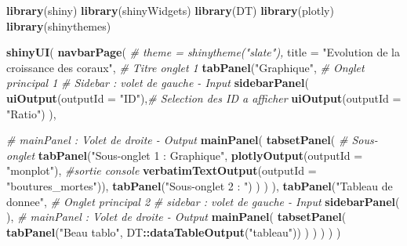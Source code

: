 \documentclass[]{report}
\newenvironment{Shaded}{\begin{snugshade}}{\end{snugshade}}
\newcommand{\KeywordTok}[1]{\textcolor[rgb]{0.13,0.29,0.53}{\textbf{#1}}}
\newcommand{\DataTypeTok}[1]{\textcolor[rgb]{0.13,0.29,0.53}{#1}}
\newcommand{\StringTok}[1]{\textcolor[rgb]{0.31,0.60,0.02}{#1}}
\newcommand{\CommentTok}[1]{\textcolor[rgb]{0.56,0.35,0.01}{\textit{#1}}}
\newcommand{\OperatorTok}[1]{\textcolor[rgb]{0.81,0.36,0.00}{\textbf{#1}}}
\newcommand{\NormalTok}[1]{#1}
\begin{document}
\begin{Shaded}
\begin{Highlighting}[]
\KeywordTok{library}\NormalTok{(shiny)}
\KeywordTok{library}\NormalTok{(shinyWidgets)}
\KeywordTok{library}\NormalTok{(DT)}
\KeywordTok{library}\NormalTok{(plotly)}
\KeywordTok{library}\NormalTok{(shinythemes)}

\KeywordTok{shinyUI}\NormalTok{(}
  \KeywordTok{navbarPage}\NormalTok{(}
    \CommentTok{# theme = shinytheme("slate"),}
    \DataTypeTok{title =} \StringTok{"Evolution de la croissance des coraux"}\NormalTok{, }\CommentTok{# Titre onglet 1}
    \KeywordTok{tabPanel}\NormalTok{(}\StringTok{"Graphique"}\NormalTok{, }\CommentTok{# Onglet principal 1}
             \CommentTok{# Sidebar : volet de gauche - Input}
             \KeywordTok{sidebarPanel}\NormalTok{(}
               \KeywordTok{uiOutput}\NormalTok{(}\DataTypeTok{outputId =} \StringTok{"ID"}\NormalTok{),}\CommentTok{# Selection des ID a afficher}
               \KeywordTok{uiOutput}\NormalTok{(}\DataTypeTok{outputId =} \StringTok{"Ratio"}\NormalTok{)}
\NormalTok{             ),}

             \CommentTok{# mainPanel : Volet de droite - Output}
             \KeywordTok{mainPanel}\NormalTok{(}
               \KeywordTok{tabsetPanel}\NormalTok{( }\CommentTok{# Sous-onglet}
                 \KeywordTok{tabPanel}\NormalTok{(}\StringTok{"Sous-onglet 1 : Graphique"}\NormalTok{,}
                          \KeywordTok{plotlyOutput}\NormalTok{(}\DataTypeTok{outputId =} \StringTok{"monplot"}\NormalTok{),}
                          \CommentTok{#sortie console}
                          \KeywordTok{verbatimTextOutput}\NormalTok{(}\DataTypeTok{outputId =} \StringTok{"boutures_mortes"}\NormalTok{)),}
                 \KeywordTok{tabPanel}\NormalTok{(}\StringTok{"Sous-onglet 2 : "}\NormalTok{)}
\NormalTok{               )}
\NormalTok{             )}
\NormalTok{    ),}
    \KeywordTok{tabPanel}\NormalTok{(}\StringTok{"Tableau de donnee"}\NormalTok{, }\CommentTok{# Onglet principal 2}
             \CommentTok{# sidebar : volet de gauche - Input}
             \KeywordTok{sidebarPanel}\NormalTok{(}
\NormalTok{             ),}
             \CommentTok{# mainPanel : Volet de droite - Output}
             \KeywordTok{mainPanel}\NormalTok{(}
               \KeywordTok{tabsetPanel}\NormalTok{(}
                 \KeywordTok{tabPanel}\NormalTok{(}\StringTok{"Beau tablo"}\NormalTok{, DT}\OperatorTok{::}\KeywordTok{dataTableOutput}\NormalTok{(}\StringTok{"tableau"}\NormalTok{))}
\NormalTok{               )}
\NormalTok{             )}
\NormalTok{    )}
\NormalTok{  )}
\NormalTok{)}
\end{Highlighting}
\end{Shaded}
\end{document}
